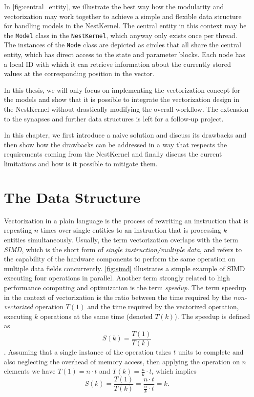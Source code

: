In \autoref{fig:central_entity}, we illustrate the best way how the modularity and vectorization may work together to achieve a simple and flexible data structure for handling models in the NestKernel. The central entity in this context may be the \texttt{Model} class in the \texttt{NestKernel}, which anyway only exists once per thread. The instances of the \texttt{Node} class are depicted as circles that all share the central entity, which has direct access to the state and parameter blocks. Each node has a local ID with which it can retrieve information about the currently stored values at the corresponding position in the vector.
 
In this thesis, we will only focus on implementing the vectorization concept for the models and show that it is possible to integrate the vectorization design in the NestKernel without drastically modifying the overall workflow. The extension to the synapses and further data structures is left for a follow-up project.

In this chapter, we first introduce a naive solution and discuss its drawbacks and then show how the drawbacks can be addressed in a way that respects the requirements coming from the NestKernel and finally discuss the current limitations and how is it possible to mitigate them.

\section{The Data Structure}

Vectorization in a plain language is the process of rewriting an instruction that is repeating $n$ times over single entities to an instruction that is processing $k$ entities simultaneously. Usually, the term vectorization overlaps with the term \emph{SIMD}, which is the short form of \emph{single instruction/multiple data}, and refers to the capability of the hardware components to perform the same operation on multiple data fields concurrently. \autoref{fig:simd} illustrates a simple example of SIMD executing four operations in parallel. Another term strongly related to high performance computing and optimization is the term \emph{speedup}. The term speedup in the context of vectorization is the ratio between the time required by the \emph{non-vectorized} operation $T(1)$ and the time required by the vectorized operation, executing $k$ operations at the same time (denoted $T(k)$). The speedup is defined as $$S(k) = \frac{T(1)}{T(k)}$$. Assuming that a single instance of the operation takes $t$ units to complete and also neglecting the overhead of memory access, then applying the operation on $n$ elements we have $T(1) = n \cdot t$ and $T(k) = \frac{n}{k} \cdot t$, which implies $$S(k) = \frac{T(1)}{T(k)} = \frac{n \cdot t}{\frac{n}{k} \cdot t} = k.$$

